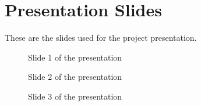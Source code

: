 \chapter{Presentation Slides}
\label{ch:slides_appendix}
These are the slides used for the project presentation.

\begin{figure}[ht!]
\centering
	\caption{Slide 1 of the presentation \label{slide1}}
\end{figure}

\begin{figure}[ht!]
\centering
	\caption{Slide 2 of the presentation \label{slide2}}
\end{figure}

\begin{figure}[ht!]
\centering
	\caption{Slide 3 of the presentation \label{slide3}}
\end{figure}

